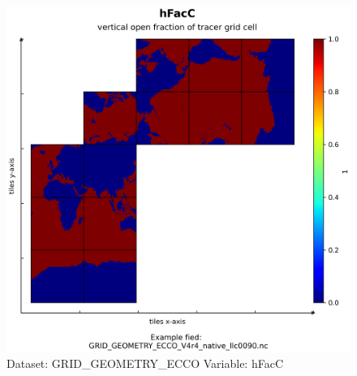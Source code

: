 \begin{figure}[H]
\centering
\includegraphics[width=\textwidth]{../images/plots/native_plots_coords/Geometry_Parameters_for_the_Lat-Lon-Cap_90_(llc90)_Native_Model_Grid_(Version_4_Release_4)/hFacC.png}
\caption{Dataset: GRID\_GEOMETRY\_ECCO Variable: hFacC}
\label{tab:table-GRID_GEOMETRY_ECCO_hFacC-Plot}
\end{figure}
\pagebreak
